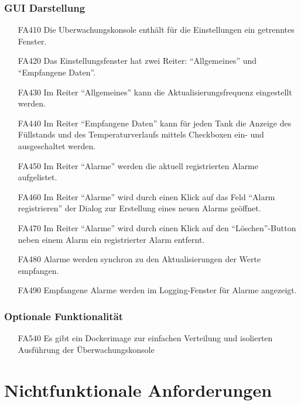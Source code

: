 \documentclass[parskip=full]{scrartcl}
\begin{document}
\subsubsection{GUI Darstellung}
\begin{enumerate}
\item[FA410] Die \gls{Uberwachungskonsole} enthält für die Einstellungen ein getrenntes Fenster.
\item[FA420] Das Einstellungsfenster hat zwei Reiter: ``Allgemeines'' und ``Empfangene Daten''.
\item[FA430] Im Reiter ``Allgemeines'' kann die Aktualisierungsfrequenz eingestellt werden.
\item[FA440] Im Reiter ``Empfangene Daten'' kann für jeden Tank die Anzeige des Füllstands und des Temperaturverlaufs mittels Checkboxen ein- und ausgeschaltet werden.
\item[FA450] Im Reiter ``Alarme'' werden die aktuell registrierten Alarme aufgelistet.
\item[FA460] Im Reiter ``Alarme'' wird durch einen Klick auf das Feld ``Alarm registrieren'' der Dialog zur Erstellung eines
  neuen Alarms ge\"offnet.
\item[FA470] Im Reiter ``Alarme'' wird durch einen Klick auf den ``L\"oschen''-Button neben einem Alarm ein registrierter Alarm entfernt.
\item[FA480] Alarme werden synchron zu den Aktualisierungen der Werte empfangen.
\item[FA490] Empfangene Alarme werden im Logging-Fenster f\"ur Alarme angezeigt.
\end{enumerate}

\subsubsection{Optionale Funktionalität}
\label{konsole-optional}
\begin{enumerate}
\item[FA540] Es gibt ein \gls{Dockerimage} zur einfachen Verteilung und isolierten Ausführung der Überwachungskonsole
\end{enumerate}

\section{Nichtfunktionale Anforderungen}
\end{document}
